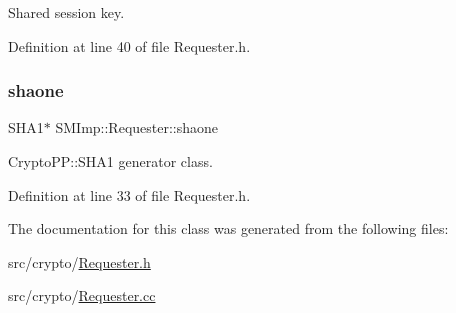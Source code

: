 Shared session key. 



Definition at line 40 of file Requester.\+h.

\mbox{\label{classSMImp_1_1Requester_aab1bd0f1a383b17cad9e2621c2650411}} 
\subsubsection{\texorpdfstring{shaone}{shaone}}
{\footnotesize\ttfamily S\+H\+A1$\ast$ S\+M\+Imp\+::\+Requester\+::shaone}



Crypto\+P\+P\+::\+S\+H\+A1 generator class. 



Definition at line 33 of file Requester.\+h.



The documentation for this class was generated from the following files\+:\begin{DoxyCompactItemize}
\item 
src/crypto/\hyperlink{Requester_8h}{Requester.\+h}\item 
src/crypto/\hyperlink{Requester_8cc}{Requester.\+cc}\end{DoxyCompactItemize}
